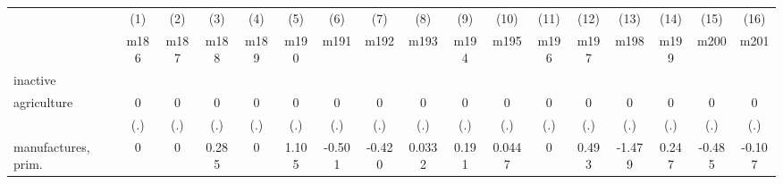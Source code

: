 {
\def\sym#1{\ifmmode^{#1}\else\(^{#1}\)\fi}
\begin{tabular}{l*{16}{c}}
\hline\hline
                    &\multicolumn{1}{c}{(1)}&\multicolumn{1}{c}{(2)}&\multicolumn{1}{c}{(3)}&\multicolumn{1}{c}{(4)}&\multicolumn{1}{c}{(5)}&\multicolumn{1}{c}{(6)}&\multicolumn{1}{c}{(7)}&\multicolumn{1}{c}{(8)}&\multicolumn{1}{c}{(9)}&\multicolumn{1}{c}{(10)}&\multicolumn{1}{c}{(11)}&\multicolumn{1}{c}{(12)}&\multicolumn{1}{c}{(13)}&\multicolumn{1}{c}{(14)}&\multicolumn{1}{c}{(15)}&\multicolumn{1}{c}{(16)}\\
                    &\multicolumn{1}{c}{m186}&\multicolumn{1}{c}{m187}&\multicolumn{1}{c}{m188}&\multicolumn{1}{c}{m189}&\multicolumn{1}{c}{m190}&\multicolumn{1}{c}{m191}&\multicolumn{1}{c}{m192}&\multicolumn{1}{c}{m193}&\multicolumn{1}{c}{m194}&\multicolumn{1}{c}{m195}&\multicolumn{1}{c}{m196}&\multicolumn{1}{c}{m197}&\multicolumn{1}{c}{m198}&\multicolumn{1}{c}{m199}&\multicolumn{1}{c}{m200}&\multicolumn{1}{c}{m201}\\
\hline
inactive            &                     &                     &                     &                     &                     &                     &                     &                     &                     &                     &                     &                     &                     &                     &                     &                     \\
agriculture         &           0         &           0         &           0         &           0         &           0         &           0         &           0         &           0         &           0         &           0         &           0         &           0         &           0         &           0         &           0         &           0         \\
                    &         (.)         &         (.)         &         (.)         &         (.)         &         (.)         &         (.)         &         (.)         &         (.)         &         (.)         &         (.)         &         (.)         &         (.)         &         (.)         &         (.)         &         (.)         &         (.)         \\
[1em]
manufactures, prim. &           0         &           0         &       0.285         &           0         &       1.105         &      -0.501         &      -0.420         &      0.0332         &       0.191         &      0.0447         &           0         &       0.493         &      -1.479         &       0.247         &      -0.485         &      -0.107         \\

\end{tabular}}
